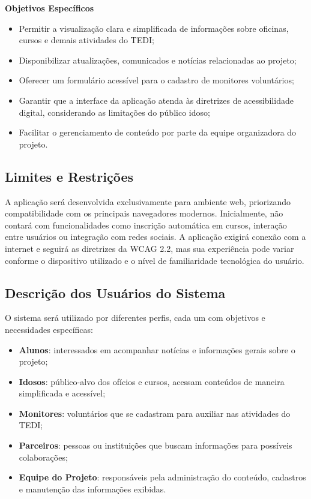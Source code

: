 \documentclass[a4paper,12pt]{article}
\begin{document}
\textbf{Objetivos Específicos}
\begin{itemize}
    \item Permitir a visualização clara e simplificada de informações sobre oficinas, cursos e demais atividades do TEDI;
    \item Disponibilizar atualizações, comunicados e notícias relacionadas ao projeto;
    \item Oferecer um formulário acessível para o cadastro de monitores voluntários;
    \item Garantir que a interface da aplicação atenda às diretrizes de acessibilidade digital, considerando as limitações do público idoso;
    \item Facilitar o gerenciamento de conteúdo por parte da equipe organizadora do projeto.
\end{itemize}

\subsection{Limites e Restrições}
A aplicação será desenvolvida exclusivamente para ambiente web, priorizando compatibilidade com os principais navegadores modernos. Inicialmente, não contará com funcionalidades como inscrição automática em cursos, interação entre usuários ou integração com redes sociais. A aplicação exigirá conexão com a internet e seguirá as diretrizes da WCAG 2.2, mas sua experiência pode variar conforme o dispositivo utilizado e o nível de familiaridade tecnológica do usuário.


\subsection{Descrição dos Usuários do Sistema}
O sistema será utilizado por diferentes perfis, cada um com objetivos e necessidades específicas:
\begin{itemize}
    \item \textbf{Alunos}: interessados em acompanhar notícias e informações gerais sobre o projeto;
    \item \textbf{Idosos}: público-alvo dos ofícios e cursos, acessam conteúdos de maneira simplificada e acessível;
    \item \textbf{Monitores}: voluntários que se cadastram para auxiliar nas atividades do TEDI;
    \item \textbf{Parceiros}: pessoas ou instituições que buscam informações para possíveis colaborações;
    \item \textbf{Equipe do Projeto}: responsáveis pela administração do conteúdo, cadastros e manutenção das informações exibidas.
\end{itemize}
\end{document}
